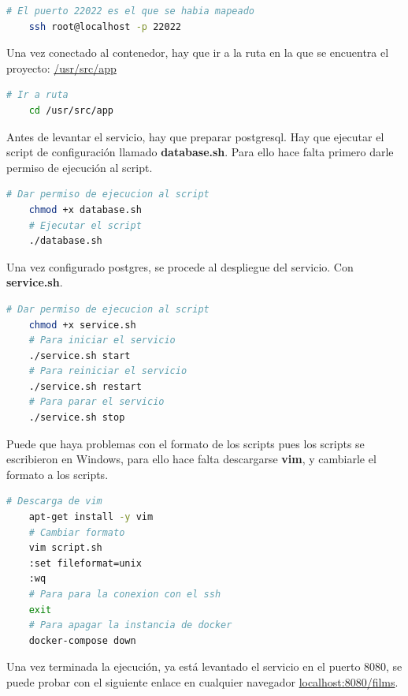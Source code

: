 \begin{lstlisting}[language=bash, caption=Conexión ssh]
    # El puerto 22022 es el que se habia mapeado
    ssh root@localhost -p 22022
\end{lstlisting}

Una vez conectado al contenedor, hay que ir a la ruta en la que se encuentra el proyecto: \url{/usr/src/app}

\begin{lstlisting}[language=bash, caption=Ir a la ruta del proyecto]
    # Ir a ruta
    cd /usr/src/app
\end{lstlisting}

Antes de levantar el servicio, hay que preparar postgresql. 
Hay que ejecutar el script de configuración llamado \textbf{database.sh}. Para ello hace falta primero darle permiso de ejecución al 
script.

\begin{lstlisting}[language=bash, caption=Configuración postgresql]
    # Dar permiso de ejecucion al script
    chmod +x database.sh
    # Ejecutar el script
    ./database.sh
\end{lstlisting}

Una vez configurado postgres, se procede al despliegue del servicio. Con \textbf{service.sh}.

\begin{lstlisting}[language=bash, caption=Despliegue]
    # Dar permiso de ejecucion al script
    chmod +x service.sh
    # Para iniciar el servicio
    ./service.sh start
    # Para reiniciar el servicio
    ./service.sh restart
    # Para parar el servicio
    ./service.sh stop
\end{lstlisting}

Puede que haya problemas con el formato 
de los scripts pues los scripts se escribieron en Windows, 
para ello hace falta descargarse \textbf{vim}, y cambiarle el formato a los scripts.

\begin{lstlisting}[language=bash, caption=Ayudas]
    # Descarga de vim
    apt-get install -y vim
    # Cambiar formato
    vim script.sh
    :set fileformat=unix
    :wq
    # Para para la conexion con el ssh
    exit 
    # Para apagar la instancia de docker
    docker-compose down
\end{lstlisting}

Una vez terminada la ejecución, ya está levantado el servicio en el puerto 8080, 
se puede probar con el siguiente enlace en cualquier navegador
\url{localhost:8080/films}.

